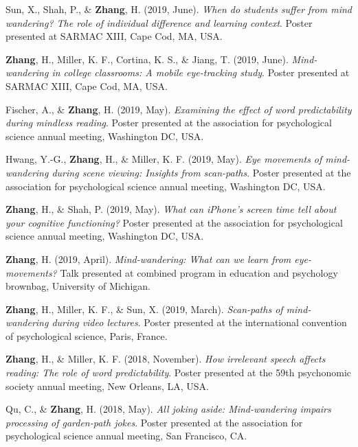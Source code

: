 \documentclass[11pt, a4paper]{awesome-cv}
\begin{document}
\leavevmode\hypertarget{ref-sun_when_2019}{}%
Sun, X., Shah, P., \& \textbf{Zhang}, H. (2019, June). \emph{When do
students suffer from mind wandering? The role of individual difference
and learning context}. Poster presented at SARMAC XIII, Cape Cod, MA,
USA.

\leavevmode\hypertarget{ref-zhang_mind-wandering_2019}{}%
\textbf{Zhang}, H., Miller, K. F., Cortina, K. S., \& Jiang, T. (2019,
June). \emph{Mind-wandering in college classrooms: A mobile eye-tracking
study}. Poster presented at SARMAC XIII, Cape Cod, MA, USA.

\leavevmode\hypertarget{ref-fischer_examining_2019}{}%
Fischer, A., \& \textbf{Zhang}, H. (2019, May). \emph{Examining the
effect of word predictability during mindless reading}. Poster presented
at the association for psychological science annual meeting, Washington
DC, USA.

\leavevmode\hypertarget{ref-hwang_eye_2019}{}%
Hwang, Y.-G., \textbf{Zhang}, H., \& Miller, K. F. (2019, May).
\emph{Eye movements of mind-wandering during scene viewing: Insights
from scan-paths}. Poster presented at the association for psychological
science annual meeting, Washington DC, USA.

\leavevmode\hypertarget{ref-zhang_what_2019}{}%
\textbf{Zhang}, H., \& Shah, P. (2019, May). \emph{What can iPhone's
screen time tell about your cognitive functioning?} Poster presented at
the association for psychological science annual meeting, Washington DC,
USA.

\leavevmode\hypertarget{ref-zhang_mind-wandering_2019-1}{}%
\textbf{Zhang}, H. (2019, April). \emph{Mind-wandering: What can we
learn from eye-movements?} Talk presented at combined program in
education and psychology brownbag, University of Michigan.

\leavevmode\hypertarget{ref-zhang_scan-paths_2019}{}%
\textbf{Zhang}, H., Miller, K. F., \& Sun, X. (2019, March).
\emph{Scan-paths of mind-wandering during video lectures}. Poster
presented at the international convention of psychological science,
Paris, France.

\leavevmode\hypertarget{ref-zhang_how_2018}{}%
\textbf{Zhang}, H., \& Miller, K. F. (2018, November). \emph{How
irrelevant speech affects reading: The role of word predictability}.
Poster presented at the 59th psychonomic society annual meeting, New
Orleans, LA, USA.

\leavevmode\hypertarget{ref-qu_all_2018}{}%
Qu, C., \& \textbf{Zhang}, H. (2018, May). \emph{All joking aside:
Mind-wandering impairs processing of garden-path jokes}. Poster
presented at the association for psychological science annual meeting,
San Francisco, CA.
\end{document}
